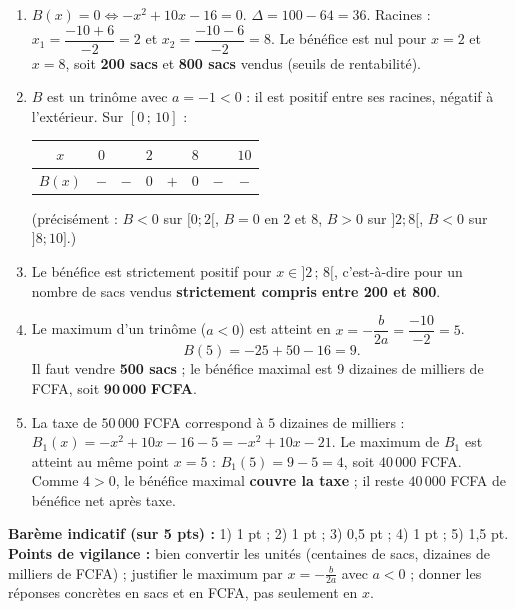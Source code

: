 \documentclass[11pt]{article}
\begin{document}
\begin{corrige}
\begin{enumerate}
    \item $B(x) = 0 \iff -x^2 + 10x - 16 = 0$. $\Delta = 100 - 64 = 36$. Racines : $x_1 = \dfrac{-10 + 6}{-2} = 2$ et $x_2 = \dfrac{-10 - 6}{-2} = 8$.
    Le bénéfice est nul pour $x = 2$ et $x = 8$, soit \textbf{200 sacs} et \textbf{800 sacs} vendus (seuils de rentabilité).
    \item $B$ est un trinôme avec $a = -1 < 0$ : il est positif entre ses racines, négatif à l'extérieur. Sur $[0\,;\,10]$ :
    \begin{center}
    \begin{tabular}{|c|ccccccc|}\hline
    $x$ & $0$ & & $2$ & & $8$ & & $10$ \\ \hline
    $B(x)$ & $-$ & $-$ & $0$ & $+$ & $0$ & $-$ & $-$ \\ \hline
    \end{tabular}
    \end{center}
    (précisément : $B < 0$ sur $[0;2[$, $B = 0$ en $2$ et $8$, $B > 0$ sur $]2;8[$, $B < 0$ sur $]8;10]$.)
    \item Le bénéfice est strictement positif pour $x \in ]2\,;\,8[$, c'est-à-dire pour un nombre de sacs vendus \textbf{strictement compris entre 200 et 800}.
    \item Le maximum d'un trinôme ($a < 0$) est atteint en $x = -\dfrac{b}{2a} = \dfrac{-10}{-2} = 5$.
    \[ B(5) = -25 + 50 - 16 = 9. \]
    Il faut vendre \textbf{500 sacs} ; le bénéfice maximal est $9$ dizaines de milliers de FCFA, soit $\mathbf{90\,000}$ \textbf{FCFA}.
    \item La taxe de $50\,000$ FCFA correspond à $5$ dizaines de milliers : $B_1(x) = -x^2 + 10x - 16 - 5 = -x^2 + 10x - 21$.
    Le maximum de $B_1$ est atteint au même point $x = 5$ : $B_1(5) = 9 - 5 = 4$, soit $40\,000$ FCFA. Comme $4 > 0$, le bénéfice maximal \textbf{couvre la taxe} ; il reste $40\,000$ FCFA de bénéfice net après taxe.
\end{enumerate}
\textbf{Barème indicatif (sur 5 pts) :} 1) 1 pt ; 2) 1 pt ; 3) 0,5 pt ; 4) 1 pt ; 5) 1,5 pt.
\textbf{Points de vigilance :} bien convertir les unités (centaines de sacs, dizaines de milliers de FCFA) ; justifier le maximum par $x = -\frac{b}{2a}$ avec $a < 0$ ; donner les réponses concrètes en sacs et en FCFA, pas seulement en $x$.
\end{corrige}
\end{document}
